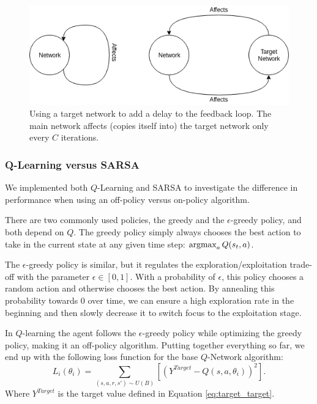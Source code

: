 \begin{figure}[h]
    \centering
    \includegraphics[width=1\linewidth]{img/Target_Network.png}
    \caption{Using a target network to add a delay to the feedback loop. The main network affects (copies itself into) the target network only every $C$ iterations.}
    \label{fig:targetnet}
\end{figure}


\subsubsection{Q-Learning versus SARSA}\label{sec:ql_sarsa}
We implemented both $Q$-Learning \citep{watkins1989learning} and SARSA \citep{rummery1994line} to investigate the difference in performance when using an off-policy versus on-policy algorithm. 

There are two commonly used policies, the greedy and the $\epsilon$-greedy policy, and both depend on $Q$. The greedy policy simply always chooses the best action to take in the current state at any given time step: $\operatorname*{argmax}_a Q(s_t, a)$.

The $\epsilon$-greedy policy is similar, but it regulates the exploration/exploitation trade-off with the parameter $\epsilon \in [0,1]$. With a probability of $\epsilon$, this policy chooses a random action and otherwise chooses the best action. By annealing this probability towards 0 over time, we can ensure a high exploration rate in the beginning and then slowly decrease it to switch focus to the exploitation stage.

In $Q$-learning the agent follows the $\epsilon$-greedy policy while optimizing the greedy policy, making it an off-policy algorithm. Putting together everything so far, we end up with the following loss function for the base $Q$-Network algorithm:
\begin{equation}
    L_i(\theta_i)= \sum_{(s,a,r,s') \sim U(B)}[(Y^{Target}-Q(s,a,\theta_i))^2].
\end{equation}
Where $Y^{Target}$ is the target value defined in Equation \eqref{eq:target_target}.

